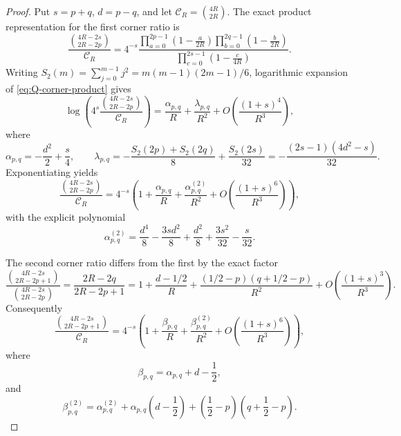 \documentclass[10pt,a4paper]{amsart}
\begin{document}
\begin{proof}
Put \(s=p+q\), \(d=p-q\), and let
\(\mathscr C_R=\binom{4R}{2R}\).  The exact product representation for the
first corner ratio is
\begin{equation}
 \frac{\binom{4R-2s}{2R-2p}}{\mathscr C_R}
 =4^{-s}
 \frac{
   \displaystyle\prod_{a=0}^{2p-1}\left(1-\frac{a}{2R}\right)
   \displaystyle\prod_{b=0}^{2q-1}\left(1-\frac{b}{2R}\right)}
  {\displaystyle\prod_{c=0}^{2s-1}\left(1-\frac{c}{4R}\right)}.
 \label{eq:Q-corner-product}
\end{equation}
Writing
\(S_2(m)=\sum_{j=0}^{m-1}j^2=m(m-1)(2m-1)/6\), logarithmic expansion of
\eqref{eq:Q-corner-product} gives
\begin{equation}
 \log\!\left(
 4^s\frac{\binom{4R-2s}{2R-2p}}{\mathscr C_R}\right)
 =\frac{\alpha_{p,q}}R+\frac{\lambda_{p,q}}{R^2}
 +O\!\left(\frac{(1+s)^4}{R^3}\right),
 \label{eq:Q-corner-log-second}
\end{equation}
where
\begin{equation}
 \alpha_{p,q}=-\frac{d^2}{2}+\frac{s}{4},
 \qquad
 \lambda_{p,q}
 =-\frac{S_2(2p)+S_2(2q)}8+\frac{S_2(2s)}{32}
 =-\frac{(2s-1)(4d^2-s)}{32}.
 \label{eq:alpha-lambda-corner}
\end{equation}
Exponentiating yields
\begin{equation}
 \frac{\binom{4R-2s}{2R-2p}}{\mathscr C_R}
 =4^{-s}\left(
 1+\frac{\alpha_{p,q}}R
 +\frac{\alpha^{(2)}_{p,q}}{R^2}
 +O\!\left(\frac{(1+s)^6}{R^3}\right)\right),
 \label{eq:Q-corner-second-local}
\end{equation}
with the explicit polynomial
\begin{equation}
 {
 \alpha^{(2)}_{p,q}
 =\frac{d^4}{8}-\frac{3sd^2}{8}
 +\frac{d^2}{8}+\frac{3s^2}{32}-\frac{s}{32}.}
 \label{eq:alpha-second-polynomial}
\end{equation}

The second corner ratio differs from the first by the exact factor
\begin{equation}
 \frac{\binom{4R-2s}{2R-2p+1}}
      {\binom{4R-2s}{2R-2p}}
 =\frac{2R-2q}{2R-2p+1}
 =1+\frac{d-1/2}{R}
 +\frac{(1/2-p)(q+1/2-p)}{R^2}
 +O\!\left(\frac{(1+s)^3}{R^3}\right).
 \label{eq:P-over-Q-local-factor}
\end{equation}
Consequently
\begin{equation}
 \frac{\binom{4R-2s}{2R-2p+1}}{\mathscr C_R}
 =4^{-s}\left(
 1+\frac{\beta_{p,q}}R
 +\frac{\beta^{(2)}_{p,q}}{R^2}
 +O\!\left(\frac{(1+s)^6}{R^3}\right)\right),
 \label{eq:P-corner-second-local}
\end{equation}
where
\begin{equation}
 \beta_{p,q}=\alpha_{p,q}+d-\frac12,
 \label{eq:beta-first-polynomial}
\end{equation}
and
\begin{equation}
 {
 \beta^{(2)}_{p,q}
 =\alpha^{(2)}_{p,q}
 +\alpha_{p,q}\left(d-\frac12\right)
 +\left(\frac12-p\right)\left(q+\frac12-p\right).}
 \label{eq:beta-second-polynomial}
\end{equation}


\end{proof}
\end{document}
